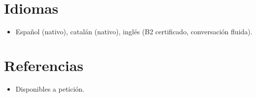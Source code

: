 \documentclass[11pt,a4paper,sans]{moderncv}
\begin{document}

\section{Idiomas}
\vspace{1pt}
\begin{itemize}
\item Español (nativo), catalán (nativo), inglés (B2 certificado, conversación fluida).
\end{itemize}


\section{Referencias}
\vspace{1pt}
\begin{itemize}
\item{Disponibles a petición.}
\end{itemize}
\end{document}
